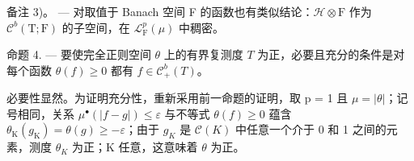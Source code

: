 备注 3)。 --- 对取值于 Banach 空间 F 的函数也有类似结论：\(\mathcal{H} \otimes \mathrm{F}\) 作为 \(\mathcal{C}^b (\mathrm{T};\mathrm{F})\) 的子空间，在 \(\mathcal{L}_{\mathrm{F}}^{p}(\mu)\) 中稠密。

命题 4. --- 要使完全正则空间 \(\theta\) 上的有界复测度 \(T\) 为正，必要且充分的条件是对每个函数 \(\theta(f) \geqslant 0\) 都有 \(f \in \mathcal{C}_{+}^{b}(T)\)。

必要性显然。为证明充分性，重新采用前一命题的证明，取 p = 1 且 \(\mu = |\theta|\)；记号相同，关系 \(\mu^{\bullet}(|f - g|) \leqslant \varepsilon\) 与不等式 \(\theta(f) \geqslant 0\) 蕴含 \(\theta_{\mathrm{K}}(g_{\mathrm{K}}) = \theta(g) \geqslant -\varepsilon\)；由于 \(g_{K}\) 是 \(\mathcal{C}(K)\) 中任意一个介于 0 和 1 之间的元素，测度 \(\theta_{K}\) 为正；K 任意，这意味着 \(\theta\) 为正。

